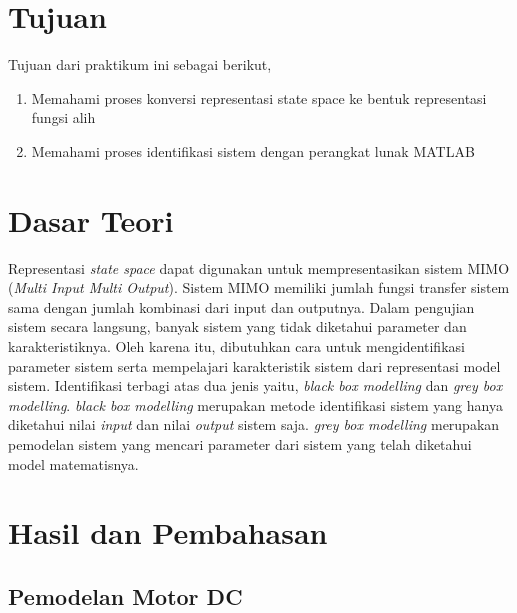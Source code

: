\documentclass[../main.tex]{subfiles}
\begin{document}
    \section{Tujuan}
        Tujuan dari praktikum ini sebagai berikut,
        \begin{enumerate}
            \item Memahami proses konversi representasi state space ke bentuk representasi fungsi alih
            \item Memahami proses identifikasi sistem dengan perangkat lunak MATLAB
        \end{enumerate}
    \section{Dasar Teori}
        Representasi \textit{state space} dapat digunakan untuk mempresentasikan sistem MIMO (\textit{Multi Input Multi Output}). Sistem MIMO memiliki jumlah fungsi transfer sistem sama dengan jumlah kombinasi dari input dan outputnya. Dalam pengujian sistem secara langsung, banyak sistem yang tidak diketahui parameter dan karakteristiknya. Oleh karena itu, dibutuhkan cara untuk mengidentifikasi parameter sistem serta mempelajari karakteristik sistem dari representasi model sistem. Identifikasi terbagi atas dua jenis yaitu, \textit{black box modelling} dan \textit{grey box modelling}. \textit{black box modelling} merupakan metode identifikasi sistem yang hanya diketahui nilai \textit{input} dan nilai \textit{output} sistem saja. \textit{grey box modelling} merupakan pemodelan sistem yang mencari parameter dari sistem yang telah diketahui model matematisnya\cite{Fahmizal}.
    \section{Hasil dan Pembahasan}
        \subsection{Pemodelan Motor DC}
\end{document}
